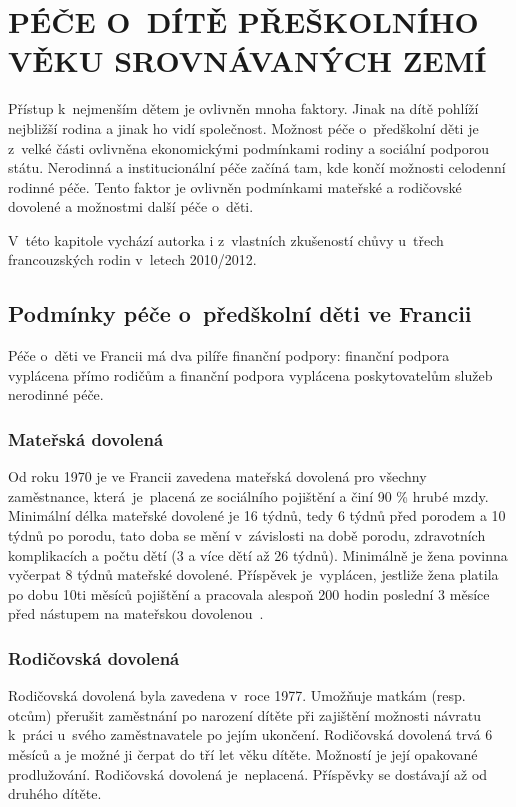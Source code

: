 \chapter{PÉČE O~DÍTĚ PŘEŠKOLNÍHO VĚKU SROVNÁVANÝCH ZEMÍ}

	Přístup k nejmenším dětem je ovlivněn mnoha faktory. Jinak na dítě pohlíží nejbližší rodina a jinak ho vidí společnost. Možnost péče o~předškolní děti je z velké části ovlivněna ekonomickými podmínkami rodiny a sociální podporou státu. Nerodinná a institucionální péče začíná tam, kde končí možnosti celodenní rodinné péče. Tento faktor je ovlivněn podmínkami mateřské a rodičovské dovolené a možnostmi další péče o~děti.

	V~této kapitole vychází autorka i z~vlastních zkušeností chůvy u~třech francouzských rodin v~letech 2010/2012.

		\section{Podmínky péče o~předškolní děti ve Francii}
		Péče o~děti ve Francii má dva pilíře finanční podpory: finanční podpora vyplácena přímo rodičům a finanční podpora vyplácena poskytovatelům služeb nerodinné péče. 


			\subsection{Mateřská dovolená}
				Od roku 1970 je ve Francii zavedena mateřská dovolená pro všechny zaměstnance, která je placená ze sociálního pojištění a činí 90 \% hrubé mzdy. Minimální délka mateřské dovolené je 16 týdnů, tedy 6 týdnů před porodem a 10 týdnů po porodu, tato doba se mění v závislosti na době porodu, zdravotních komplikacích a počtu dětí (3 a více dětí až 26 týdnů). Minimálně je žena povinna vyčerpat 8 týdnů mateřské dovolené. Příspěvek je vyplácen, jestliže žena platila po dobu 10ti měsíců pojištění a pracovala alespoň 200 hodin poslední 3 měsíce před nástupem na mateřskou dovolenou~\citep{Dennipece}.

			\subsection{Rodičovská dovolená}
				Rodičovská dovolená byla zavedena v roce 1977. Umožňuje matkám (resp. otcům) přerušit zaměstnání po narození dítěte při zajištění možnosti návratu k práci u~svého zaměstnavatele po jejím ukončení. Rodičovská dovolená trvá 6 měsíců a je možné ji čerpat do tří let věku dítěte. Možností je její opakované prodlužování. Rodičovská dovolená je neplacená. Příspěvky se dostávají až od druhého dítěte. 

